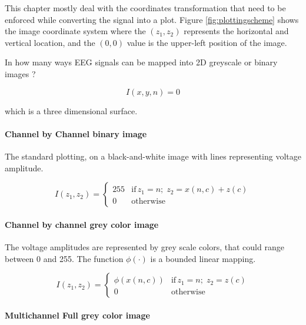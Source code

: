 This chapter mostly deal with the coordinates transformation that need to be enforced while converting the signal into a plot.  Figure \ref{fig:plottingscheme} shows the image coordinate system where the $(z_1,z_2)$ represents the horizontal and vertical location, and the $(0,0)$ value is the upper-left position of the image.

In how many ways EEG signals can be mapped into 2D greyscale or binary images ?

\begin{equation}
I(x,y,n) = 0
\label{eq:standarizedaverages}
\end{equation}

which is a three dimensional surface.

\paragraph{Channel by Channel binary image }

The standard plotting, on a black-and-white image with lines representing voltage amplitude.

\begin{equation}
I(z_1,z_2) = \left\{ \begin{array}{rl}
255 & \text{if} \,  z_1 =  n; \; z_2 = x(n,c) + z(c) \\
0   & \mbox{otherwise}
\end{array}\right.
\label{eq:images}
\end{equation}

\paragraph{Channel by channel grey color image}

The voltage amplitudes are represented by grey scale colors, that could range between 0 and 255.  The function $\phi( \cdot )$ is a bounded linear mapping.

\begin{equation}
I(z_1,z_2) = \left\{ \begin{array}{rl}
\phi(x(n,c)) & \text{if} \,  z_1 = n; \; z_2 = z(c) \\
0   & \mbox{otherwise}
\end{array}\right.
\label{eq:images}
\end{equation}

\paragraph{Multichannel Full grey color image}

